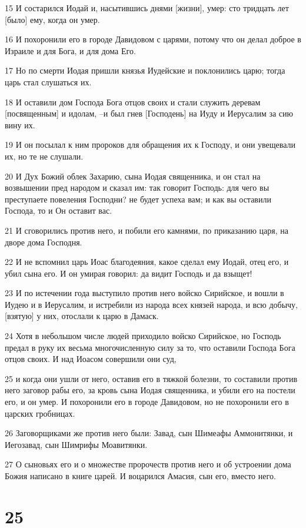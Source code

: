 \par 15 И состарился Иодай и, насытившись днями [жизни], умер: сто тридцать лет [было] ему, когда он умер.
\par 16 И похоронили его в городе Давидовом с царями, потому что он делал доброе в Израиле и для Бога, и для дома Его.
\par 17 Но по смерти Иодая пришли князья Иудейские и поклонились царю; тогда царь стал слушаться их.
\par 18 И оставили дом Господа Бога отцов своих и стали служить деревам [посвященным] и идолам, --и был гнев [Господень] на Иуду и Иерусалим за сию вину их.
\par 19 И он посылал к ним пророков для обращения их к Господу, и они увещевали их, но те не слушали.
\par 20 И Дух Божий облек Захарию, сына Иодая священника, и он стал на возвышении пред народом и сказал им: так говорит Господь: для чего вы преступаете повеления Господни? не будет успеха вам; и как вы оставили Господа, то и Он оставит вас.
\par 21 И сговорились против него, и побили его камнями, по приказанию царя, на дворе дома Господня.
\par 22 И не вспомнил царь Иоас благодеяния, какое сделал ему Иодай, отец его, и убил сына его. И он умирая говорил: да видит Господь и да взыщет!
\par 23 И по истечении года выступило против него войско Сирийское, и вошли в Иудею и в Иерусалим, и истребили из народа всех князей народа, и всю добычу, [взятую] у них, отослали к царю в Дамаск.
\par 24 Хотя в небольшом числе людей приходило войско Сирийское, но Господь предал в руку их весьма многочисленную силу за то, что оставили Господа Бога отцов своих. И над Иоасом совершили они суд,
\par 25 и когда они ушли от него, оставив его в тяжкой болезни, то составили против него заговор рабы его, за кровь сына Иодая священника, и убили его на постели его, и он умер. И похоронили его в городе Давидовом, но не похоронили его в царских гробницах.
\par 26 Заговорщиками же против него были: Завад, сын Шимеафы Аммонитянки, и Иегозавад, сын Шимрифы Моавитянки.
\par 27 О сыновьях его и о множестве пророчеств против него и об устроении дома Божия написано в книге царей. И воцарился Амасия, сын его, вместо него.

\chapter{25}

